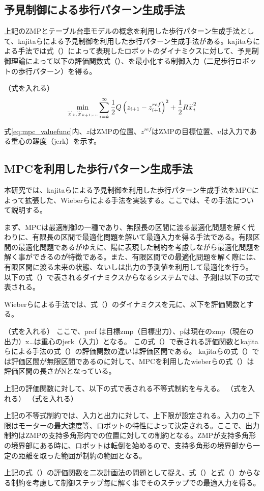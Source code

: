 \newpage

\subsection{予見制御による歩行パターン生成手法}
上記のZMPとテーブル台車モデルの概念を利用した歩行パターン生成手法として、kajitaらによる予見制御を利用した歩行パターン生成手法\cite{PREVIEW}がある。kajitaらによる手法では式（）によって表現したロボットのダイナミクスに対して、予見制御理論によって以下の評価関数式（）、を最小化する制御入力（二足歩行ロボットの歩行パターン）を得る。

（式を入れる）
\begin{equation}
  \min_{{\buildrel\ldots\over{x}}_{k},{\buildrel\ldots\over{x}}_{k+1},\ldots}\sum_{i=k}^{\infty}{1\over 2}Q\left(z_{i+1}-z_{i+1}^{ref}\right)^{2}+{1\over 2}R{\buildrel\ldots\over{x}}_{i}^{2}
  \label{eq:mpc_valuefunc}
\end{equation}

式\eqref{eq:mpc_valuefunc}内、$z$はZMPの位置、$z^{ref}$はZMPの目標位置、$u$は入力である重心の躍度（jerk）を示す。

\subsection{MPCを利用した歩行パターン生成手法}
本研究では、kajitaらによる予見制御を利用した歩行パターン生成手法\cite{PREVIEW}をMPCによって拡張した、Wieberらによる手法\cite{WIEBER}を実装する。ここでは、その手法\cite{WIEBER}について説明する。

まず、MPCは最適制御の一種であり、無限長の区間に渡る最適化問題を解く代わりに、有限長の区間で最適化問題を解いて最適入力を得る手法である。有限区間の最適化問題であるがゆえに、陽に表現した制約を考慮しながら最適化問題を解く事ができるのが特徴である。また、有限区間での最適化問題を解く際には、有限区間に渡る未来の状態、ないしは出力の予測値を利用して最適化を行う。
以下の式（）で表されるダイナミクスからなるシステムでは、予測は以下の式で表される。

Wieberらによる手法\cite{WIEBER}では、式（）のダイナミクスを元に、以下を評価関数とする。

（式を入れる）
ここで、pref は目標zmp（目標出力）、pは現在のzmp（現在の出力）x…は重心のjerk（入力）となる。
この式（）で表される評価関数とkajitaらによる手法の式（）の評価関数の違いは評価区間である。
kajitaらの式（）では評価区間が無限区間であるのに対して、MPCを利用したwieberらの式（）は評価区間の長さがNとなっている。

上記の評価関数に対して、以下の式で表される不等式制約を与える。
（式を入れる）
（式を入れる）

上記の不等式制約では、入力と出力に対して、上下限が設定される。入力の上下限はモーターの最大速度等、ロボットの特性によって決定される。ここで、出力制約はZMPの支持多角形内での位置に対しての制約となる。ZMPが支持多角形の境界部にある時に、ロボットは転倒を始めるので、支持多角形の境界部から一定の距離を取った範囲が制約の範囲となる。

上記の式（）の評価関数を二次計画法の問題として捉え、式（）と式（）からなる制約を考慮して制御ステップ毎に解く事でそのステップでの最適入力を得る。